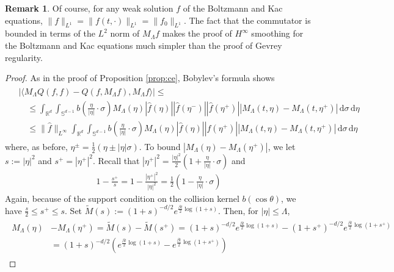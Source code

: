 \documentclass[11pt,a4paper,reqno]{amsart}
\theoremstyle{plain}
\theoremstyle{definition}
\newtheorem{remark}[proposition]{Remark}
\begin{document}
\begin{remark} Of course, for any weak solution $f$ of the Boltzmann and Kac equations, $\|f\|_{L^1}=\|f(t,\cdot)\|_{L^1} = \|f_0\|_{L^1}$.
 The fact that the commutator is bounded in terms of the $L^2$ norm of
 $M_\Lambda f$ makes the proof of $H^\infty$ smoothing for the Boltzmann and Kac equations much simpler than the proof of Gevrey regularity.
\end{remark}
\begin{proof}
  As in the proof of Proposition \ref{prop:ce}, Bobylev's formula shows
  \begin{align}
  \begin{split}\label{eq:easyce1}
  	&|\langle  M_{\Lambda}Q(f,f) - Q(f,M_{\Lambda}f), M_{\Lambda}f\rangle|
  	\le  \\
  	&\quad \le
  	 \int_{{\mathbb{R}}^d} \int_{{\mathbb{S}}^{d-1}} b\left(\frac{\eta}{|\eta|}\cdot\sigma\right) M_{\Lambda}(\eta) |\hat{f}(\eta)|
  	 |\hat{f}(\eta^-)|  |\hat{f}(\eta^+)|
  	 |M_\Lambda(t,\eta)- M_\Lambda(t,\eta^+)|
  	  \,\mathrm{d}\sigma \,\mathrm{d}\eta \\
  	&\quad \le
  	  \|\hat{f}\|_{L^\infty} \int_{{\mathbb{R}}^d} \int_{{\mathbb{S}}^{d-1}} b\left(\frac{\eta}{|\eta|}\cdot\sigma\right) M_{\Lambda}(\eta) |\hat{f}(\eta)|
     |\hat{f}(\eta^+)|
  	 |M_\Lambda(t,\eta)- M_\Lambda(t,\eta^+)|
  	  \,\mathrm{d}\sigma \,\mathrm{d}\eta
  \end{split}
  \end{align}	
    where, as before, $\eta^\pm = \frac{1}{2}(\eta \pm |\eta|\sigma)$.
  To bound $|M_\Lambda(\eta)- M_\Lambda(\eta^+)|$, we let $s:=|\eta|^2$ and $s^{+} = |\eta^{+}|^2$. Recall that $|\eta^+|^2= \frac{|\eta|^2}{2}(1+ \frac{\eta}{|\eta|}\cdot\sigma)$ and
  \begin{align*}
  	1-\frac{s^+}{s} = 1-\frac{|\eta^+|^2}{|\eta|^2} = \frac{1}{2}\left(1-\frac{\eta}{|\eta|}\cdot\sigma\right)
  \end{align*}
  Again, because of the support condition on the collision kernel $b(\cos\theta)$, we have $\frac{s}{2} \leq s^+ \leq s$. Set
  $\widetilde{M}(s):= (1+s)^{-d/2}e^{\frac{\beta t}{2}\log(1+s)}$.
  Then, for $|\eta|\le \Lambda$,
  \begin{align}
  \begin{split}\label{eq:easyce2}
  	M_\Lambda(\eta) & - M_\Lambda(\eta^+)
  	 = \widetilde{M}(s)- \widetilde{M}(s^+)
  	  = (1+s)^{-d/2}e^{\frac{\beta t}{2}\log(1+s)} - (1+s^+)^{-d/2}e^{\frac{\beta t}{2}\log(1+s^+)} \\
  	&=
  		(1+s)^{-d/2}\left(e^{\frac{\beta t}{2}\log(1+s)} - e^{\frac{\beta t}{2}\log(1+s^+)}\right)

\end{split}
\end{align}
\end{proof}
\end{document}
